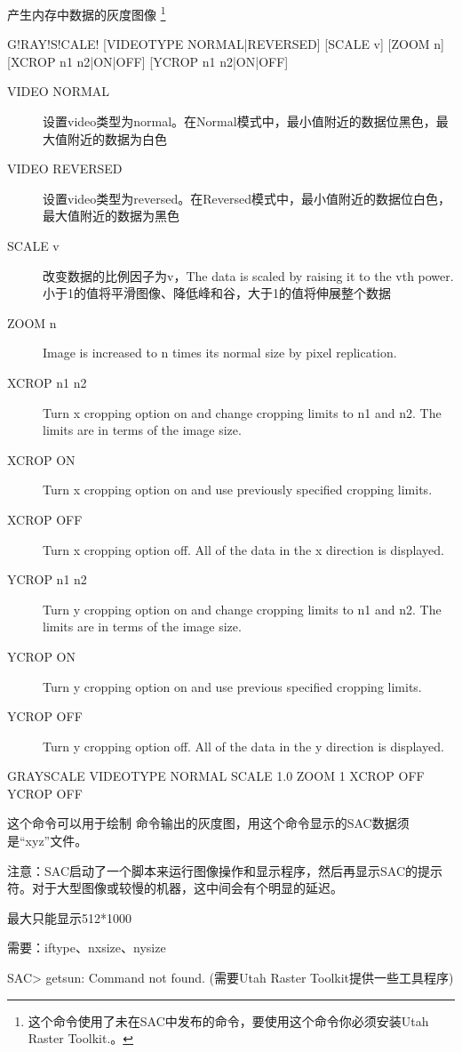 \label{cmd:grayscale}

产生内存中数据的灰度图像
\footnote{
这个命令使用了未在SAC中发布的命令，要使用这个命令你必须安装Utah Raster Toolkit.。
}

\begin{SACSTX}
G!RAY!S!CALE! [VIDEOTYPE NORMAL|REVERSED] [SCALE v] [ZOOM n]
    [XCROP n1 n2|ON|OFF] [YCROP n1 n2|ON|OFF]
\end{SACSTX}

\begin{description}
\item [VIDEO NORMAL] 设置video类型为normal。在Normal模式中，最小值附近的数据位黑色，最大值附近的数据为白色
\item [VIDEO REVERSED] 设置video类型为reversed。在Reversed模式中，最小值附近的数据位白色，最大值附近的数据为黑色
\item [SCALE v] 改变数据的比例因子为v，The data is scaled by raising it to the vth power.小于1的值将平滑图像、降低峰和谷，大于1的值将伸展整个数据
\item [ZOOM n] Image is increased to n times its normal size by pixel replication.
\item [XCROP n1 n2] Turn x cropping option on and change cropping limits to n1 and n2. The limits are in terms of the image size.
\item [XCROP ON] Turn x cropping option on and use previously specified cropping limits.
\item [XCROP OFF] Turn x cropping option off.  All of the data in the x direction is displayed.
\item [YCROP n1 n2] Turn y cropping option on and change cropping limits to n1 and n2. The limits are in terms of the image size.
\item [YCROP ON] Turn y cropping option on and use previous specified cropping limits.
\item [YCROP OFF] Turn y cropping option off.  All of the data in the y direction is displayed.
\end{description}

\begin{SACDFT}
GRAYSCALE VIDEOTYPE NORMAL SCALE 1.0 ZOOM 1 XCROP OFF YCROP OFF
\end{SACDFT}

这个命令可以用于绘制  命令输出的灰度图，用这个命令显示的SAC数据须是``xyz''文件。

注意：SAC启动了一个脚本来运行图像操作和显示程序，然后再显示SAC的提示符。对于大型图像或较慢的机器，这中间会有个明显的延迟。

最大只能显示512*1000

需要：iftype、nxsize、nysize

SAC> getsun: Command not found.  (需要Utah Raster Toolkit提供一些工具程序)
